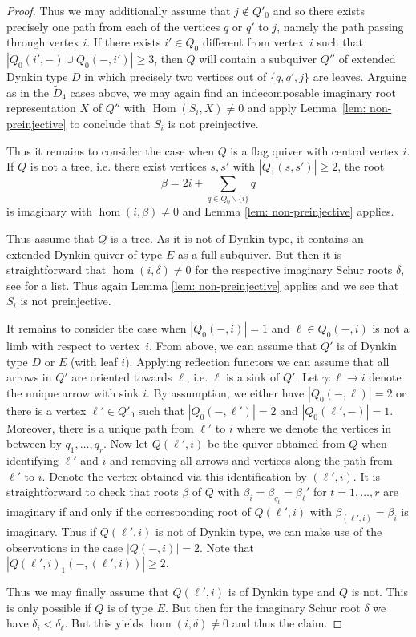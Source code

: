 \documentclass{amsart}
\numberwithin{equation}{section}
\newcommand{\Hom}{\operatorname{Hom}}
\begin{document}
\begin{proof}
  Thus we may additionally assume that $j\notin Q'_0$ and so there exists precisely one path from each of the vertices $q$ or $q'$ to $j$, namely the path passing through vertex $i$.
  If there exists $i'\in Q_0$ different from vertex~$i$ such that $|Q_0(i',-)\cup Q_0(-,i')|\geq 3$, then $Q$ will contain a subquiver $Q''$ of extended Dynkin type $D$ in which precisely two vertices out of $\{q,q',j\}$ are leaves.
  Arguing as in the $\tilde D_4$ cases above, we may again find an indecomposable imaginary root representation $X$ of $Q''$ with $\Hom(S_i,X)\neq 0$ and apply Lemma~\ref{lem: non-preinjective} to conclude that $S_i$ is not preinjective.

  Thus it remains to consider the case when $Q$ is a flag quiver with central vertex $i$.
  If $Q$ is not a tree, i.e. there exist vertices $s,s'$ with $|Q_1(s,s')|\geq 2$, the root 
  $$\beta=2i+\sum_{q\in Q_0\backslash\{i\}}q$$
  is imaginary with $\hom(i,\beta)\neq 0$ and Lemma \ref{lem: non-preinjective} applies.
  
  Thus assume that $Q$ is a tree.
  As it is not of Dynkin type, it contains an extended Dynkin quiver of type $E$ as a full subquiver.
  But then it is straightforward that $\hom(i,\delta)\neq 0$ for the respective imaginary Schur roots $\delta$, see \cite[Section 4]{CB} for a list.
  Thus again Lemma \ref{lem: non-preinjective} applies and we see that $S_i$ is not preinjective.
	
  It remains to consider the case when $|Q_0(-,i)|=1$ and $\ell\in Q_0(-,i)$ is not a limb with respect to vertex~$i$.
  From above, we can assume that $Q'$ is of Dynkin type $D$ or $E$ (with leaf $i$).
  Applying reflection functors we can assume that all arrows in $Q'$ are oriented towards $\ell$, i.e. $\ell$ is a sink of $Q'$.
  Let $\gamma:\ell\to i$ denote the unique arrow with sink $i$. 
By assumption, we either have $|Q_0(-,\ell)|=2$ or there is a vertex $\ell'\in Q'_0$ such that $|Q_0(-,\ell')|=2$ and $|Q_0(\ell',-)|=1$.
Moreover, there is a unique path from $\ell'$ to $i$ where we denote the vertices in between by $q_1,\ldots,q_r$.
Now let $Q(\ell',i)$ be the quiver obtained from $Q$ when identifying $\ell'$ and $i$ and removing all arrows and vertices along the path from $\ell'$ to $i$.
Denote the vertex obtained via this identification by $(\ell',i)$.
It is straightforward to check that roots $\beta$ of $Q$ with $\beta_i=\beta_{q_t}=\beta_\ell'$ for $t=1,\ldots,r$ are imaginary if and only if the corresponding root of $Q(\ell',i)$ with $\beta_{(\ell',i)}=\beta_i$ is imaginary.
Thus if $Q(\ell',i)$ is not of Dynkin type, we can make use of the observations in the case $|Q(-,i)|=2$.
Note that $|Q(\ell',i)_1(-,(\ell',i))|\geq 2$.

Thus we may finally assume that $Q(\ell',i)$ is of Dynkin type and $Q$ is not.
This is only possible if $Q$ is of type $E$.
But then for the imaginary Schur root $\delta$ we have $\delta_i<\delta_\ell$.
But this yields $\hom(i,\delta)\neq 0$ and thus the claim.
\end{proof}
\end{document}
